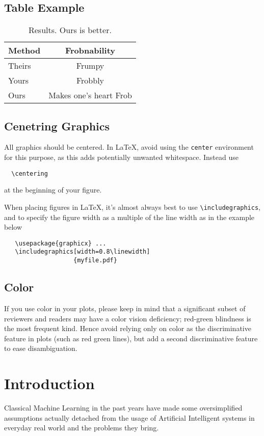 \documentclass[10pt,twocolumn,letterpaper]{article}
\begin{document}
\subsection{Table Example}
\begin{table}
  \centering
  \begin{tabular}{@{}lc@{}}
    \toprule
    Method & Frobnability \\
    \midrule
    Theirs & Frumpy \\
    Yours & Frobbly \\
    Ours & Makes one's heart Frob\\
    \bottomrule
  \end{tabular}
  \caption{Results.   Ours is better.}
  \label{tab:example}
\end{table}
\subsection{Cenetring Graphics}
All graphics should be centered.
In \LaTeX, avoid using the \texttt{center} environment for this purpose, as this adds potentially unwanted whitespace.
Instead use
{\small\begin{verbatim}
  \centering
\end{verbatim}}
at the beginning of your figure.

When placing figures in \LaTeX, it's almost always best to use \verb+\includegraphics+, and to specify the figure width as a multiple of the line width as in the example below
{\small\begin{verbatim}
   \usepackage{graphicx} ...
   \includegraphics[width=0.8\linewidth]
                   {myfile.pdf}
\end{verbatim}
}
\subsection{Color}
If you use color in your plots, please keep in mind that a significant subset of reviewers and readers may have a color vision deficiency; red-green blindness is the most frequent kind.
Hence avoid relying only on color as the discriminative feature in plots (such as red \vs green lines), but add a second discriminative feature to ease disambiguation.

\section{Introduction}
\label{sec:intro}
Classical Machine Learning in the past years have made some oversimplified assumptions actually detached 
from the usage of Artificial Intelligent systems in everyday real world and the problems they bring.
\end{document}

